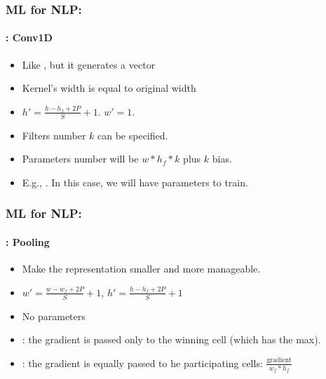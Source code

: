 \documentclass[xcolor=table]{beamer}
\begin{document}
	\begin{frame}
		\frametitle{ML for NLP: \insertsection}
		\framesubtitle{\insertsubsection: Conv1D}
		
		\begin{minipage}{0.62\textwidth} 
			\begin{itemize}
				\item Like , but it generates a vector
				\item Kernel's width is equal to original width
				\item $ h' = \frac{h - h_f + 2P}{S} + 1$. $ w' = 1$.
				\item Filters number $k$ can be specified.
				\item Parameters number will be $w * h_f * k$ plus $k$ bias.
				\item E.g., . In this case, we will have  parameters to train.
			\end{itemize}
		\end{minipage}
		\begin{minipage}{0.37\textwidth}
		\end{minipage}
		
	\end{frame}
	
	\begin{frame}
		\frametitle{ML for NLP: \insertsection}
		\framesubtitle{\insertsubsection: Pooling}
		
		\begin{minipage}{0.60\textwidth} 
			\begin{itemize}
				\item Make the representation smaller and more manageable.
				\item $ w' = \frac{w - w_f + 2P}{S} + 1$,  $ h' = \frac{h - h_f + 2P}{S} + 1$
				\item No parameters 
				\item {}: the gradient is passed only to the winning cell (which has the max).
				\item {}: the gradient is equally passed to he participating cells: $\frac{\text{gradient}}{w_f * h_f}$ 
			\end{itemize}
		\end{minipage}
		\begin{minipage}{0.39\textwidth}
			\hgraphpage[\textwidth]{maxpool.pdf}
		\end{minipage}
		
	\end{frame}
\end{document}
